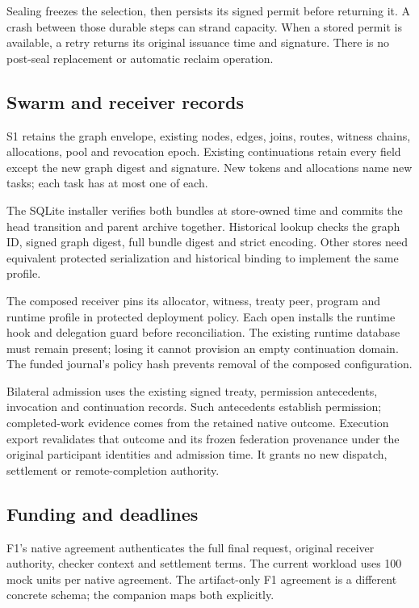 Sealing freezes the selection, then persists its signed permit before returning
it. A crash between those durable steps can strand capacity. When a stored
permit is available, a retry returns its original issuance time and signature.
There is no post-seal replacement or automatic reclaim operation.

\subsection{Swarm and receiver records}
S1 retains the graph envelope, existing nodes, edges, joins, routes, witness
chains, allocations, pool and revocation epoch. Existing continuations retain
every field except the new graph digest and signature. New tokens and
allocations name new tasks; each task has at most one of each.

The SQLite installer verifies both bundles at store-owned time and commits the
head transition and parent archive together. Historical lookup checks the
graph ID, signed graph digest, full bundle digest and strict encoding.
Other stores need equivalent protected serialization and historical binding
to implement the same profile.

The composed receiver pins its allocator, witness, treaty peer, program and
runtime profile in protected deployment policy. Each open installs the runtime
hook and delegation guard before reconciliation. The existing runtime database
must remain present; losing it cannot provision an empty continuation domain.
The funded journal's policy hash prevents removal of the composed configuration.

Bilateral admission uses the existing signed treaty, permission antecedents,
invocation and continuation records. Such antecedents establish permission;
completed-work evidence comes from the retained native outcome. Execution export
revalidates that outcome and its frozen federation provenance under the
original participant identities and admission time. It grants no new dispatch,
settlement or remote-completion authority.

\subsection{Funding and deadlines}
F1's native agreement authenticates the full final request, original receiver
authority, checker context and settlement terms. The current workload uses
100 mock units per native agreement. The artifact-only F1 agreement is a
different concrete schema; the companion maps both explicitly.

